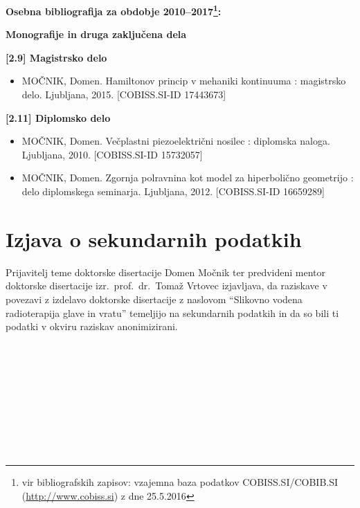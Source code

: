 \documentclass[a4paper,twoside,11pt]{article}
\begin{document}
	\par{\noindent
		\textbf{Osebna bibliografija za obdobje 2010--2017\footnote{vir bibliografskih zapisov: vzajemna baza podatkov COBISS.SI/COBIB.SI (\href{http://www.cobiss.si}{http://www.cobiss.si}) z dne 25.5.2016}: \\}
		\par{\noindent \textbf{Monografije in druga zaključena dela} \\}
		\vspace{-0.3cm}
		\par{\noindent \textbf{[2.9] Magistrsko delo}}
		\begin{itemize}[align=right, itemsep=-0.05cm]
			\item[1.] MOČNIK, Domen. Hamiltonov princip v mehaniki kontinuuma : magistrsko delo. Ljubljana, 2015. [COBISS.SI-ID 17443673]
		\end{itemize}
		\par{\noindent \textbf{[2.11] Diplomsko delo}}
		\begin{itemize}[align=right, itemsep=-0.05cm]
			\item[2.] MOČNIK, Domen. Večplastni piezoelektrični nosilec : diplomska naloga. Ljubljana, 2010. [COBISS.SI-ID 15732057]
			\item[3.] MOČNIK, Domen. Zgornja polravnina kot model za hiperbolično geometrijo : delo diplomskega seminarja. Ljubljana, 2012. [COBISS.SI-ID 16659289]
		\end{itemize}

		\newpage
		\section{Izjava o sekundarnih podatkih}
		\par{		
		Prijavitelj teme doktorske disertacije Domen Močnik ter predvideni mentor doktorske disertacije izr.\ prof.\ dr.\ Tomaž Vrtovec izjavljava, da raziskave v povezavi z izdelavo doktorske disertacije z naslovom ``Slikovno vodena radioterapija glave in vratu'' temeljijo na sekundarnih podatkih in da so bili ti podatki v okviru raziskav anonimizirani.
		}
		\\\\\\
		\noindent{}
		\\\\\\
		\noindent{} \hfill{}
		\\\\\\
		\noindent{} \hfill{}\\
		
}
\end{document}
